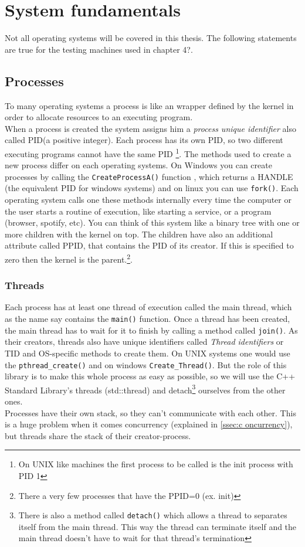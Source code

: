 \chapter{System fundamentals}
Not all operating systems will be covered in this thesis.
The following statements are true for the testing machines used in chapter 4?.
\section{Processes}
To many operating systems a process is like an wrapper defined by the kernel in order to allocate resources to an executing program.\\
When a process is created the system assigns him a \textit{process unique identifier} also called PID(a positive integer). Each process has its own PID, so two different executing programs cannot have the same PID \footnote{On UNIX like machines the first process to be called is the init process with PID 1}. The methods used to create a new process differ on each operating systems.
On Windows you can create processes by calling the \texttt{CreateProcessA()} function \cite{createProcWinAPI}, which returns a HANDLE (the equivalent PID for windows systems) and on linux you can use \texttt{fork()}\cite{LPI}. Each operating system calls one these methods internally every time the computer or the user starts a routine of execution, like starting a service, or a program (browser, spotify, etc). You can think of this system like a binary tree with one or more children with the kernel on top. The children have also an additional attribute called PPID, that contains the PID of its creator. If this is specified to zero then the kernel is the parent.\cite{wikiPPID}\footnote{There a very few processes that have the PPID=0 (ex. init)}.
\subsection{Threads} 
Each process has at least one thread of execution called the main thread, which as the name say contains the \texttt{main()} function. Once a thread has been created, the main thread has to wait for it to finish by calling a method called \texttt{join()}. As their creators, threads also have unique identifiers called \textit{Thread identifiers} or TID and OS-specific methods to create them. On UNIX systems one would use the \texttt{pthread\_create()} and on windows \texttt{Create\_Thread()}. But the role of this library is to make this whole process as easy as possible, so we will use the C++ Standard Library's threads (std::thread) and \dq detach\dq{}\footnote{There is also a method called \texttt{detach()} which allows a thread to separates itself from the main thread. This way the thread can terminate itself and the main thread doesn't have to wait for that thread's termination} ourselves from the other ones.\\
Processes have their own stack, so they can't communicate with each other. This is a huge problem when it comes concurrency (explained in \autoref{ssec:c	oncurrency}), but threads share the stack of their creator-process.
